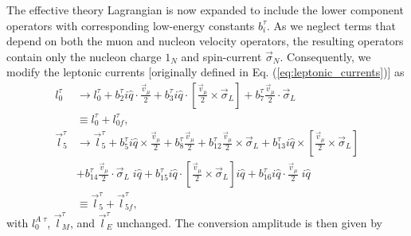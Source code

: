 \documentclass[12pt,letterpaper]{book}
\begin{document}
The effective theory Lagrangian is now expanded to include the lower component operators with corresponding low-energy constants $b_i^{\tau}$. As we neglect terms that depend on both the muon and nucleon velocity operators, the resulting operators contain only the nucleon charge $1_N$ and spin-current $\vec{\sigma}_N$. Consequently, we modify the leptonic currents [originally defined in Eq. (\ref{eq:leptonic_currents})] as
\begin{equation}
\begin{split}
l_0^{\tau}&\rightarrow l_0^{\tau}+b_2^{\tau}i\hat{q}\cdot\frac{\vec{v}_{\mu}}{2}+b_3^{\tau}i\hat{q}\cdot\left[\frac{\vec{v}_{\mu}}{2}\times\vec{\sigma}_L\right]+b_7^{\tau}\frac{\vec{v}_{\mu}}{2}\cdot\vec{\sigma}_L\\
&\equiv l_0^{\tau}+l_{0f}^{\tau},\\
\vec{l}_5^{\tau}&\rightarrow \vec{l}_5^{\tau}+b_5^{\tau}i\hat{q}\times\frac{\vec{v}_{\mu}}{2}+b_8^{\tau}\frac{\vec{v}_{\mu}}{2}+b_{12}^{\tau}\frac{\vec{v}_{\mu}}{2}\times\vec{\sigma}_L+b_{13}^{\tau}i\hat{q}\times\left[\frac{\vec{v}_{\mu}}{2}\times\vec{\sigma}_L\right]\\&+b_{14}^{\tau}\frac{\vec{v}_{\mu}}{2}\cdot\vec{\sigma}_L\;i\hat{q}
+b_{15}^{\tau}i\hat{q}\cdot\left[\frac{\vec{v}_{\mu}}{2}\times\vec{\sigma}_L\right]i\hat{q}+b_{16}^{\tau}i\hat{q}\cdot\frac{\vec{v}_{\mu}}{2}\;i\hat{q}\\
&\equiv \vec{l}_5^{\tau}+\vec{l}_{5f}^{\tau},
\end{split}
\end{equation}
with $l_0^{A\;\tau}$, $\vec{l}_M^{\tau}$, and $\vec{l}_E^{\tau}$ unchanged. The conversion amplitude is then given by
\end{document}
